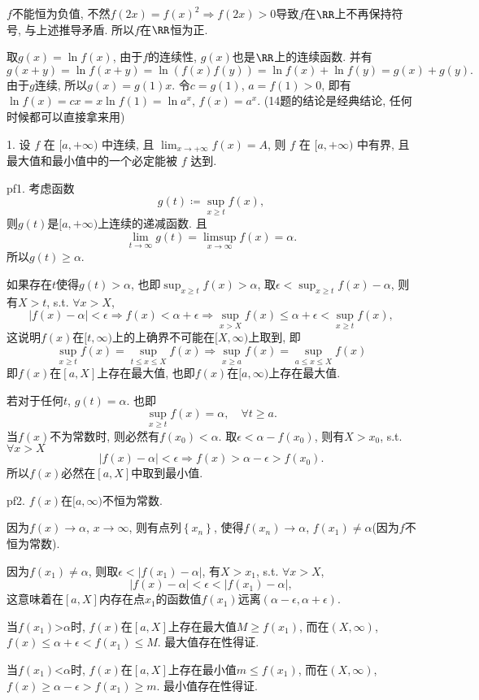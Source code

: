 $f$不能恒为负值, 不然$f(2x)=f(x)^{2}\Longrightarrow f(2x)>0$导致$f$在$\RR$上不再保持符号,
与上述推导矛盾. 所以$f$在$\RR$恒为正.

取$g(x)=\ln f(x)$, 由于$f$的连续性, $g(x)$也是$\RR$上的连续函数. 并有
\[
g(x+y)=\ln f(x+y)=\ln\left(f(x)f(y)\right)=\ln f(x)+\ln f(y)=g(x)+g(y).
\]
由于$g$连续, 所以$g(x)=g(1)x$. 令$c=g(1)$, $a=f(1)>0$, 即有$\ln f(x)=cx=x\ln f(1)=\ln a^{x}$,
$f(x)=a^{x}$. (14题的结论是经典结论, 任何时候都可以直接拿来用)

1. 设 $f$ 在 $[a,+\infty)$ 中连续, 且 $\lim_{x\rightarrow+\infty}f(x)=A$,
则 $f$ 在 $[a,+\infty)$ 中有界, 且最大值和最小值中的一个必定能被 $f$ 达到.

pf1. 考虑函数
\[
g(t)\coloneqq\sup_{x\ge t}f(x),
\]
则$g(t)$是$[a,+\infty)$上连续的递减函数. 且
\[
\lim_{t\to\infty}g(t)=\limsup_{x\to\infty}f(x)=\alpha.
\]
所以$g(t)\ge\alpha$.

如果存在$t$使得$g(t)>\alpha$, 也即$\sup_{x\ge t}f(x)>\alpha$, 取$\epsilon<\sup_{x\ge t}f(x)-\alpha$,
则有$X>t$, s.t. $\forall x>X$, 
\[
\left|f(x)-\alpha\right|<\epsilon\Longrightarrow f(x)<\alpha+\epsilon\Longrightarrow\sup_{x>X}f(x)\le\alpha+\epsilon<\sup_{x\ge t}f(x),
\]
这说明$f(x)$在$[t,\infty)$上的上确界不可能在$[X,\infty)$上取到, 即
\[
\sup_{x\ge t}f(x)=\sup_{t\le x\le X}f(x)\Longrightarrow\sup_{x\ge a}f(x)=\sup_{a\le x\le X}f(x)
\]
即$f(x)$在$[a,X]$上存在最大值, 也即$f(x)$在$[a,\infty)$上存在最大值.

若对于任何$t$, $g(t)=\alpha$. 也即
\[
\sup_{x\ge t}f(x)=\alpha,\quad\forall t\ge a.
\]
当$f(x)$不为常数时, 则必然有$f(x_{0})<\alpha$. 取$\epsilon<\alpha-f(x_{0})$,
则有$X>x_{0}$, s.t. $\forall x>X$
\[
\left|f(x)-\alpha\right|<\epsilon\Longrightarrow f(x)>\alpha-\epsilon>f(x_{0}).
\]
所以$f(x)$必然在$[a,X]$中取到最小值.

pf2. $f(x)$在$[a,\infty)$不恒为常数.

因为$f(x)\to\alpha$, $x\to\infty$, 则有点列$\left\{ x_{n}\right\} $,
使得$f(x_{n})\to\alpha$, $f(x_{1})\ne\alpha$(因为$f$不恒为常数).

因为$f(x_{1})\ne\alpha$, 则取$\epsilon<\left|f(x_{1})-\alpha\right|$,
有$X>x_{1}$, s.t. $\forall x>X$,
\[
\left|f(x)-\alpha\right|<\epsilon<\left|f(x_{1})-\alpha\right|,
\]
这意味着在$[a,X]$内存在点$x_{1}$的函数值$f(x_{1})$远离$(\alpha-\epsilon,\alpha+\epsilon)$.

当$f(x_{1})$>$\alpha$时, $f(x)$在$[a,X]$上存在最大值$M\ge f(x_{1})$, 而在$(X,\infty)$,
$f(x)\le\alpha+\epsilon<f(x_{1})\le M$. 最大值存在性得证.

当$f(x_{1})$<$\alpha$时, $f(x)$在$[a,X]$上存在最小值$m\le f(x_{1})$, 而在$(X,\infty)$,
$f(x)\ge\alpha-\epsilon>f(x_{1})\ge m$. 最小值存在性得证.

